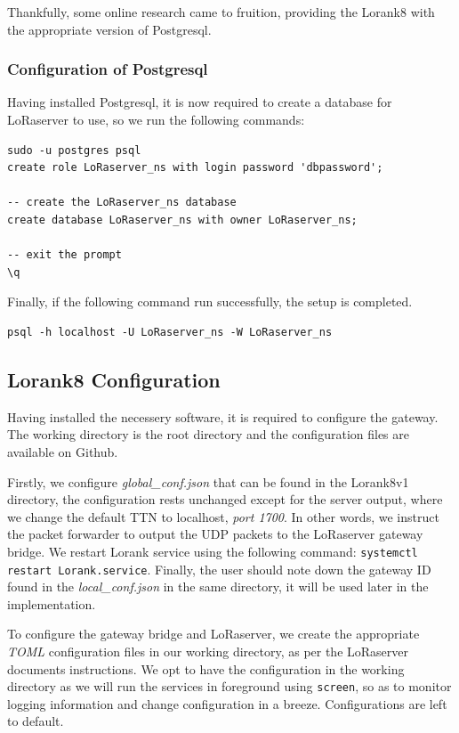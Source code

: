 Thankfully, some online research came to fruition\cite{backport}, providing the Lorank8 with the appropriate version of Postgresql.

\bigskip
\noindent
\subsubsection{Configuration of Postgresql}
Having installed Postgresql, it is now required to create a database for LoRaserver to use, so we run the following commands:

\begin{verbatim}
sudo -u postgres psql
create role LoRaserver_ns with login password 'dbpassword';

-- create the LoRaserver_ns database
create database LoRaserver_ns with owner LoRaserver_ns;

-- exit the prompt
\q
\end{verbatim}

\noindent
Finally, if the following command run successfully, the setup is completed.

\begin{verbatim}
psql -h localhost -U LoRaserver_ns -W LoRaserver_ns
\end{verbatim}


\subsection{Lorank8 Configuration}
Having installed the necessery software, it is required to configure the gateway. The working directory is the root directory and the configuration files are available on Github.

Firstly, we configure \textit{global\_conf.json} that can be found in the Lorank8v1 directory, the configuration rests unchanged except for the server output, where we change the default TTN to localhost, \textit{port 1700}. In other words, we instruct the packet forwarder to output the UDP packets to the LoRaserver gateway bridge. We restart Lorank service using the following command: \texttt{systemctl restart Lorank.service}. Finally, the user should note down the gateway ID found in the \textit{local\_conf.json }in the same directory, it will be used later in the implementation.

To configure the gateway bridge and LoRaserver, we create the appropriate \textit{TOML} configuration files in our working directory, as per the LoRaserver documents instructions. We opt to have the configuration in the working directory as we will run the services in foreground using \texttt{screen}, so as to monitor logging information and change configuration in a breeze. Configurations are left to default.

